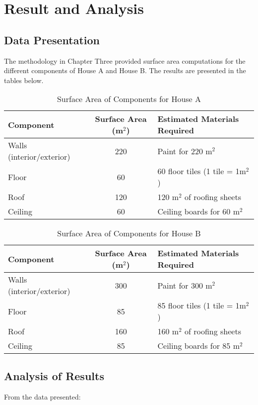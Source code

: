 \documentclass[12pt,a4paper,openany,titlepage,reqno, final]{report}
\theoremstyle{definition}
\begin{document}
	
	\chapter{Result and Analysis}
	
	\section{Data Presentation}
	The methodology in Chapter Three provided surface area computations for the different components of House A and House B. The results are presented in the tables below.
	
	\begin{table}[h!]
		\centering
		\caption{Surface Area of Components for House A}
		\begin{tabular}{|l|c|l|}
			\hline
			\textbf{Component} & \textbf{Surface Area (m$^2$)} & \textbf{Estimated Materials Required} \\ \hline
			Walls (interior/exterior) & 220 & Paint for 220 m$^2$ \\ \hline
			Floor & 60 & 60 floor tiles (1 tile = 1m$^2$) \\ \hline
			Roof & 120 & 120 m$^2$ of roofing sheets \\ \hline
			Ceiling & 60 & Ceiling boards for 60 m$^2$ \\ \hline
		\end{tabular}
	\end{table}
	
	\begin{table}[h!]
		\centering
		\caption{Surface Area of Components for House B}
		\begin{tabular}{|l|c|l|}
			\hline
			\textbf{Component} & \textbf{Surface Area (m$^2$)} & \textbf{Estimated Materials Required} \\ \hline
			Walls (interior/exterior) & 300 & Paint for 300 m$^2$ \\ \hline
			Floor & 85 & 85 floor tiles (1 tile = 1m$^2$) \\ \hline
			Roof & 160 & 160 m$^2$ of roofing sheets \\ \hline
			Ceiling & 85 & Ceiling boards for 85 m$^2$ \\ \hline
		\end{tabular}
	\end{table}
	
	\section{Analysis of Results}
	From the data presented:
	
\end{document}
